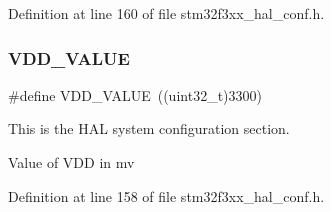 Definition at line 160 of file stm32f3xx\+\_\+hal\+\_\+conf.\+h.

\mbox{\label{stm32f3xx__hal__conf_8h_aae550dad9f96d52cfce5e539adadbbb4}} 
\subsubsection{V\+D\+D\+\_\+\+V\+A\+L\+UE}
{\footnotesize\ttfamily \#define V\+D\+D\+\_\+\+V\+A\+L\+UE~((uint32\+\_\+t)3300)}



This is the H\+AL system configuration section. 

Value of V\+DD in mv 

Definition at line 158 of file stm32f3xx\+\_\+hal\+\_\+conf.\+h.

